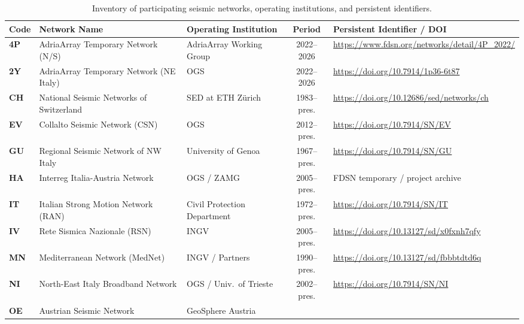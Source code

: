 \begin{landscape}
  \begin{table}[htbp]
    \centering
    \small
    \caption{Inventory of participating seismic networks, operating
    institutions, and persistent identifiers.}
    \label{tab:network_inventory}
    \begin{threeparttable}
      \begin{tabularx}{\linewidth}{l l l c X}
        \toprule
        \textbf{Code} & \textbf{Network Name} & \textbf{Operating
        Institution} & \textbf{Period} & \textbf{Persistent
        Identifier / DOI} \\
        \midrule
        \textbf{4P} & AdriaArray Temporary Network (N/S) & AdriaArray
        Working Group & 2022--2026 &
        \url{https://www.fdsn.org/networks/detail/4P_2022/} \\
        \textbf{2Y} & AdriaArray Temporary Network (NE Italy) & \ac{OGS} &
        2022--2026 & \url{https://doi.org/10.7914/1p36-6t87} \\
        \textbf{CH} & National Seismic Networks of Switzerland & SED
        at ETH Z\"urich & 1983--pres. &
        \url{https://doi.org/10.12686/sed/networks/ch} \\
        \textbf{EV} & Collalto Seismic Network (CSN) & \ac{OGS} &
        2012--pres. & \url{https://doi.org/10.7914/SN/EV} \\
        \textbf{GU} & Regional Seismic Network of NW Italy &
        University of Genoa & 1967--pres. &
        \url{https://doi.org/10.7914/SN/GU} \\
        \textbf{HA} & Interreg Italia-Austria Network & \ac{OGS} / ZAMG &
        2005--pres. & \ac{FDSN} temporary / project archive \\
        \textbf{IT} & Italian Strong Motion Network (\ac{RAN}) & Civil
        Protection Department & 1972--pres. &
        \url{https://doi.org/10.7914/SN/IT} \\
        \textbf{IV} & Rete Sismica Nazionale (RSN) & \ac{INGV} &
        2005--pres. & \url{https://doi.org/10.13127/sd/x0fxnh7qfy} \\
        \textbf{MN} & Mediterranean Network (MedNet) & \ac{INGV} / Partners
        & 1990--pres. & \url{https://doi.org/10.13127/sd/fbbbtdtd6q} \\
        \textbf{NI} & North-East Italy Broadband Network & \ac{OGS} /
        Univ.\ of Trieste & 2002--pres. &
        \url{https://doi.org/10.7914/SN/NI} \\
        \textbf{OE} & Austrian Seismic Network & GeoSphere Austria

\end{tabularx}
\end{threeparttable}
\end{table}
\end{landscape}
